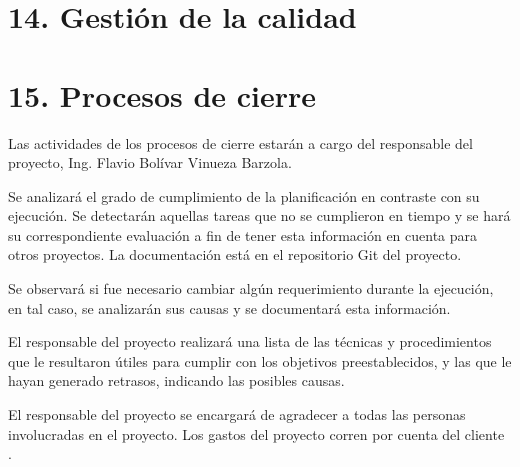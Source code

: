 \documentclass[
11pt, %
]{charter}
\begin{document}
\section{14. Gestión de la calidad}
\label{sec:calidad}



\section{15. Procesos de cierre}    
\label{sec:cierre}

Las actividades de los procesos de cierre estarán a cargo del responsable del proyecto, Ing. Flavio Bolívar Vinueza Barzola.

Se analizará el grado de cumplimiento de la planificación en contraste con su ejecución. Se
detectarán aquellas tareas que no se cumplieron en tiempo y se hará su correspondiente
evaluación a fin de tener esta información en cuenta para otros proyectos. La documentación está en el repositorio Git del proyecto.

Se observará si fue necesario cambiar algún requerimiento durante la ejecución, en tal
caso, se analizarán sus causas y se documentará esta información.

El responsable del proyecto realizará una lista de las técnicas y procedimientos que le
resultaron útiles para cumplir con los objetivos preestablecidos, y las que le hayan generado
retrasos, indicando las posibles causas.

El responsable del proyecto se encargará de agradecer a todas las personas involucradas en el
proyecto. Los gastos del proyecto corren por cuenta del cliente \clientename.
\end{document}
